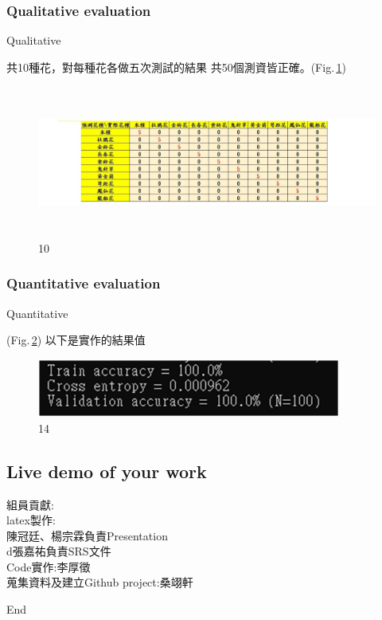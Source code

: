 \documentclass{beamer}
\begin{document}
\subsubsection{Qualitative evaluation}
\begin{frame}{Qualitative}
\begin{CJK}{UTF8}{bkai}
\small 共10種花，對每種花各做五次測試的結果 共50個測資皆正確。(Fig.\,\ref{fig:10})
 \end{CJK}
 \begin{figure}
    \includegraphics[width=12cm,height=5cm]{qualitative.jpg}
    \caption{10}
    \label{fig:10}
  \end{figure}
\end{frame}




\subsubsection{Quantitative evaluation}
\begin{frame}{Quantitative}

\begin{CJK}{UTF8}{bkai}
(Fig.\,\ref{fig:14})  
以下是實作的結果值
 \end{CJK}
 \begin{figure}
    \includegraphics[width=10cm]{Qauntitative.png}
    \caption{14}
    \label{fig:14}
  \end{figure}

\end{frame}

\subsection{Live demo of your work}
\begin{frame}
\end{frame}


\begin{frame}
 \begin{spacing}{1.5}
\begin{CJK}{UTF8}{bkai}
組員貢獻:\\
latex製作:\\
陳冠廷、楊宗霖負責Presentation\\
d張嘉祐負責SRS文件\\
Code實作:李厚徵\\
蒐集資料及建立Github project:桑翊軒
 \end{CJK}
\end{spacing}
\end{frame}

\begin{frame}
\center \huge End
\end{frame}
\end{document}
